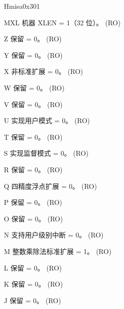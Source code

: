 \begin{register}{H}{misa}{0x301}\label{regdesc:LPMISA}
%
%
%
%
%
%
%
%
%
%
%
%
%
%
%
%
%
%
%
%
%
%
%
%
%
%
%
%
\regnewline%
\begin{regdesc}\begin{reglist}
\label{fielddesc:LPMISAMXL}\item [MXL] 机器 XLEN = 1（32 位）。 (RO)
\label{fielddesc:LPMISAZ}\item [Z] 保留 = 0。 (RO)
\label{fielddesc:LPMISAY}\item [Y] 保留 = 0。 (RO)
\label{fielddesc:LPMISAX}\item [X] 非标准扩展 = 0。 (RO)
\label{fielddesc:LPMISAW}\item [W] 保留 = 0。 (RO)
\label{fielddesc:LPMISAV}\item [V] 保留 = 0。 (RO)
\label{fielddesc:LPMISAU}\item [U] 实现用户模式 = 0。 (RO)
\label{fielddesc:LPMISAT}\item [T] 保留 = 0。 (RO)
\label{fielddesc:LPMISAS}\item [S] 实现监督模式 = 0。 (RO)
\label{fielddesc:LPMISAR}\item [R] 保留 = 0。 (RO)
\label{fielddesc:LPMISAQ}\item [Q] 四精度浮点扩展 = 0。 (RO)
\label{fielddesc:LPMISAP}\item [P] 保留 = 0。 (RO)
\label{fielddesc:LPMISAO}\item [O] 保留 = 0。 (RO)
\label{fielddesc:LPMISAN}\item [N] 支持用户级别中断 = 0。 (RO)
\label{fielddesc:LPMISAM}\item [M] 整数乘除法标准扩展 = 1。 (RO)
\label{fielddesc:LPMISAL}\item [L] 保留 = 0。 (RO)
\label{fielddesc:LPMISAK}\item [K] 保留 = 0。 (RO)
\label{fielddesc:LPMISAJ}\item [J] 保留 = 0。 (RO)

\end{reglist}
\end{regdesc}
\end{register}
